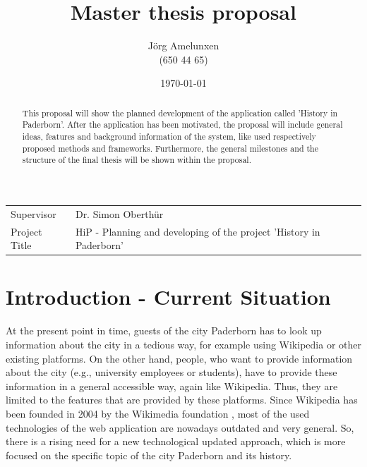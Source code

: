 \documentclass[a4page]{article}
\author{J\"org Amelunxen \\
(650 44 65)
}
\title{Master thesis proposal 
}
\date{\today}
\begin{document}
\maketitle

\newcommand{\stab}[1]{\hspace{.05\textwidth}\rlap{#1}}
\newcommand{\tab}[1]{\hspace{.1\textwidth}\rlap{#1}}

\begin{table}[!th]
\begin{tabular}{l p{}}
Supervisor & Dr. Simon Oberth\"ur \\
Project Title &  HiP - Planning and developing of the project 'History in Paderborn'
\end{tabular}
\end{table}

\begin{abstract}
This proposal will show the planned development of the application called 'History in Paderborn'. After the application has been motivated, the proposal will include general ideas, features and background information of the system, like used respectively proposed methods and frameworks. Furthermore, the general milestones and the structure of the final thesis will be shown within the proposal. 
\end{abstract}

\section{Introduction - Current Situation}
At the present point in time, guests of the city Paderborn has to look up information about the city in a tedious way, for example using Wikipedia or other existing platforms. On the other hand, people, who want to provide information about the city (e.g., university employees or students), have to provide these information in a general accessible way, again like Wikipedia. Thus, they are limited to the features that are provided by these platforms. Since Wikipedia has been founded in 2004 by the Wikimedia foundation \cite{wikimedia}, most of the used technologies of the web application are nowadays outdated and very general. So, there is a rising need for a new technological updated approach, which is more focused on the specific topic of the city Paderborn and its history. 
\end{document}
